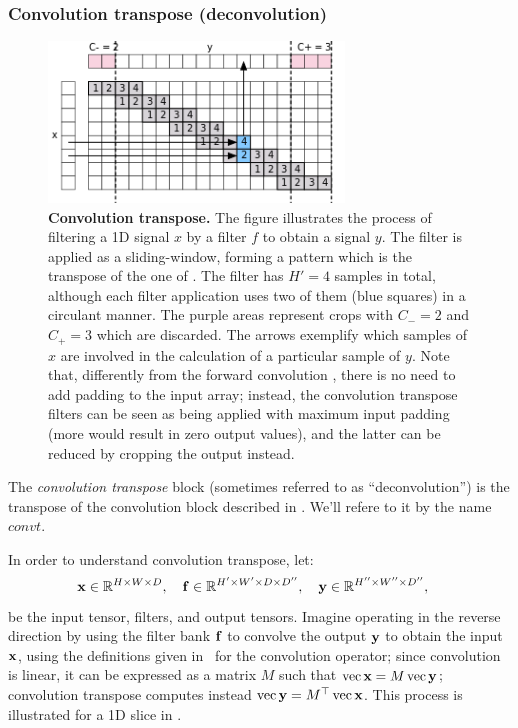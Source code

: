 \subsubsection{Convolution transpose (deconvolution)}\label{s:convt}


\begin{figure}[t]
	\centering
	\includegraphics[width=0.7\textwidth]{figures/svg/convt}
	\caption{\textbf{Convolution transpose.} The figure illustrates the process of filtering a 1D signal $x$ by a filter $f$ to obtain a signal $y$. The filter is applied as a sliding-window, forming a pattern which is the transpose of the one of . The filter has $H'=4$ samples in total, although each filter application uses two of them (blue squares) in a circulant manner. The purple areas represent crops with $C_-=2$ and $C_+=3$ which are discarded. The arrows exemplify which samples of $x$ are involved in the calculation of a particular sample of $y$. Note that, differently from the forward convolution , there is no need to add padding to the input array; instead, the convolution transpose filters can be seen as being applied with maximum input padding (more would result in zero output values), and the latter can be reduced by cropping the output instead.}\label{f:convt}
\end{figure}

The \emph{convolution transpose} block (sometimes referred to as ``deconvolution'') is the transpose of the convolution block described in . We'll refere to it by the name $convt$.

In order to understand convolution transpose, let:
\[
\mathbf{x}\in\mathbb{R}^{H \times W \times D}, \quad
\mathbf{f}\in\mathbb{R}^{H' \times W' \times D \times D''}, \quad
\mathbf{y}\in\mathbb{R}^{H'' \times W'' \times D''}, \quad
\]
be the input tensor, filters, and output tensors. Imagine operating in the reverse direction by using the filter bank $\mathbf{f}$ to convolve the output $\mathbf{y}$ to obtain the input $\mathbf{x}$, using the definitions given in~ for the convolution operator; since convolution is linear, it can be expressed as a matrix $M$ such that  $\operatorname{vec} \mathbf{x} = M \operatorname{vec}\mathbf{y}$; convolution transpose computes instead $\operatorname{vec} \mathbf{y} = M^\top \operatorname{vec} \mathbf{x}$. This process is illustrated for a 1D slice in .

